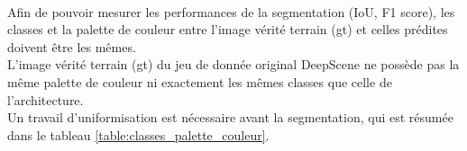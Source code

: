 ﻿
\vspace{0.5\baselineskip}
\\
\noindent Afin de pouvoir mesurer les performances de la segmentation (IoU, F1 score), les classes et la palette de couleur entre l'image vérité terrain (\acrshort{gt}) et celles prédites doivent être les mêmes.
\vspace{0.5\baselineskip}
\\
\noindent L'image vérité terrain (\acrshort{gt}) du jeu de donnée original DeepScene ne possède pas la même palette de couleur ni exactement les mêmes classes que celle de l'architecture.
\vspace{0.5\baselineskip}
\\
\noindent Un travail d'uniformisation est nécessaire avant la segmentation, qui est résumée dans le tableau \ref{table:classes_palette_couleur}.
